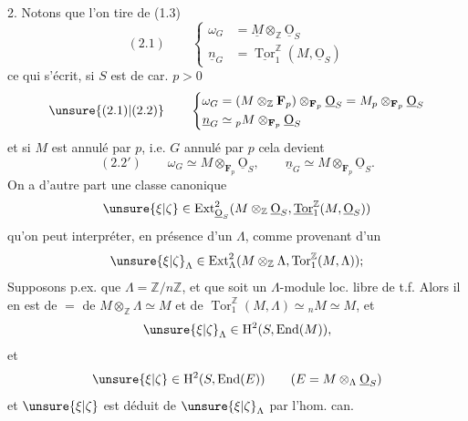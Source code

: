 2. Notons que  l'on tire de (1.3)
\[
(2.1)\qquad\left\{\begin{aligned}
\omega_G&=\underline M\otimes_{\mathbb Z}\underline{\mathrm O}_S\\
\underline n_G&=\underline{\operatorname{Tor}}_1^{\mathbb Z}(M,\underline{\mathrm O}_S)
\end{aligned}\right.
\]
ce qui s'écrit, si $S$ est de car. $p>0$
\[
\unsure{(2.1)|(2.2)}\qquad\left\{\begin{aligned}
\omega_G&=(M\otimes_{\mathbb Z}\mathbf F_p)\otimes_{\mathbf F_p}\underline{\mathrm O}_S=M_p\otimes_{\mathbf F_p}\underline{\mathrm O}_S\\
\underline n_G&\simeq {}_pM\otimes_{\mathbf F_p}\underline{\mathrm O}_S
\end{aligned}\right.
\]
et si $M$ est annulé par $p$, i.e. $G$ annulé par $p$ cela devient
\[
(2.2')\qquad \omega_G\simeq M\otimes_{\mathbf F_p}\underline{\mathrm O}_S,\qquad \underline n_G\simeq M\otimes_{\mathbf F_p}\underline{\mathrm O}_S.
\]
On a d'autre part une classe canonique
\[
\unsure{\xi|\zeta}\in\operatorname{Ext}^{2}_{\underline{\mathrm O}_S}(M\otimes_{\mathbb Z}\underline{\mathrm O}_S,\underline{\operatorname{Tor}}_1^{\mathbb Z}(M,\underline{\mathrm O}_S))
\]
qu'on peut interpréter, en présence d'un $\Lambda$, comme provenant d'un
\[
\unsure{\xi|\zeta}_\Lambda\in\operatorname{Ext}^{2}_{\Lambda}(M\otimes_{\mathbb Z}\Lambda,\operatorname{Tor}_1^{\mathbb Z}(M,\Lambda));
\]
Supposons p.ex. que $\Lambda=\mathbb Z/n\mathbb Z$, et que  soit un $\Lambda$-module loc. libre de t.f. Alors il en est de $=$ de $M\otimes_{\mathbb Z}\Lambda\simeq M$ et de $\operatorname{Tor}_1^{\mathbb Z}(M,\Lambda)\simeq{}_nM\simeq M$, et
\[
\unsure{\xi|\zeta}_\Lambda\in\mathrm H^2(S,\operatorname{End}(M)),
\]
et 
\[
\unsure{\xi|\zeta}\in\mathrm H^2(S,\operatorname{End}(E))\qquad(E=M\otimes_\Lambda\underline{\mathrm O}_S)
\]
et $\unsure{\xi|\zeta}$ est déduit de $\unsure{\xi|\zeta}_\Lambda$ par l'hom. can.
